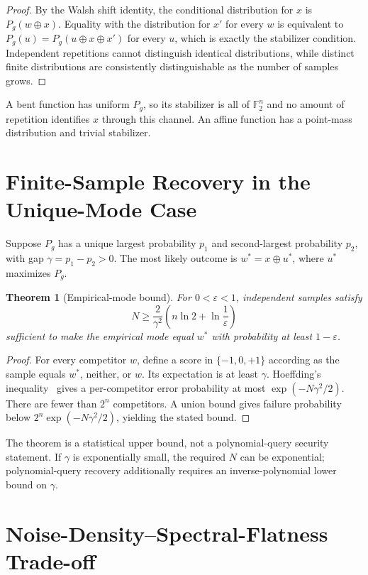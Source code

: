 \documentclass[10pt,twocolumn]{article}
\newtheorem{theorem}{Theorem}
\theoremstyle{definition}
\begin{document}
\begin{proof}
By the Walsh shift identity, the conditional distribution for $x$ is $P_g(w \oplus x)$. Equality with the distribution for $x'$ for every $w$ is equivalent to $P_g(u) = P_g(u \oplus x \oplus x')$ for every $u$, which is exactly the stabilizer condition. Independent repetitions cannot distinguish identical distributions, while distinct finite distributions are consistently distinguishable as the number of samples grows.
\end{proof}

A bent function has uniform $P_g$, so its stabilizer is all of $\mathbb{F}_2^n$ and no amount of repetition identifies $x$ through this channel. An affine function has a point-mass distribution and trivial stabilizer.

\section{Finite-Sample Recovery in the Unique-Mode Case}

Suppose $P_g$ has a unique largest probability $p_1$ and second-largest probability $p_2$, with gap $\gamma = p_1 - p_2 > 0$. The most likely outcome is $w^* = x \oplus u^*$, where $u^*$ maximizes $P_g$.

\begin{theorem}[Empirical-mode bound]\label{thm:mode}
For $0 < \varepsilon < 1$, independent samples satisfy
\[ N \geq \frac{2}{\gamma^2}\left(n \ln 2 + \ln \frac{1}{\varepsilon}\right) \]
sufficient to make the empirical mode equal $w^*$ with probability at least $1 - \varepsilon$.
\end{theorem}

\begin{proof}
For every competitor $w$, define a score in $\{-1,0,+1\}$ according as the sample equals $w^*$, neither, or $w$. Its expectation is at least $\gamma$. Hoeffding's inequality~\cite{hoeffding1963} gives a per-competitor error probability at most $\exp(-N\gamma^2/2)$. There are fewer than $2^n$ competitors. A union bound gives failure probability below $2^n \exp(-N\gamma^2/2)$, yielding the stated bound.
\end{proof}

The theorem is a statistical upper bound, not a polynomial-query security statement. If $\gamma$ is exponentially small, the required $N$ can be exponential; polynomial-query recovery additionally requires an inverse-polynomial lower bound on $\gamma$.

\section{Noise-Density--Spectral-Flatness Trade-off}
\end{document}
